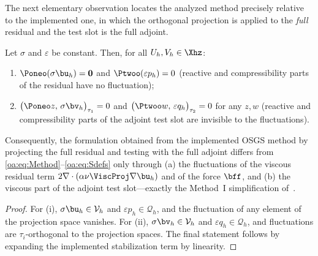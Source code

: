 The next elementary observation locates the analyzed method precisely relative to the
implemented one, in which the orthogonal projection is applied to the \emph{full}
residual and the test slot is the full adjoint.

\begin{lemma}
\label{oa:lem:annihilation}
Let $\sigma$ and $\varepsilon$ be constant. Then, for all $U_h, V_h \in \Xhz$:
\begin{enumerate}[label=\textup{(\roman*)}, itemsep=0.2ex]
  \item $\Poneo(\sigma\bu_h) = \boldsymbol{0}$ and $\Ptwoo(\varepsilon p_h) = 0$
        (reactive and compressibility parts of the residual have no fluctuation);
  \item $\bigl( \Poneo z,\, \sigma\bv_h \bigr)_{\tau_1} = 0$ and
        $\bigl( \Ptwoo w,\, \varepsilon q_h \bigr)_{\tau_2} = 0$ for any $z, w$
        (reactive and compressibility parts of the adjoint test slot are invisible to
        the fluctuations).
\end{enumerate}
Consequently, the formulation obtained from the implemented OSGS method by projecting
the full residual and testing with the full adjoint differs from
\cref{oa:eq:Method}--\cref{oa:eq:Sdefs} only through (a) the fluctuations of the viscous
residual term $2\nabla\cdot(\alpha\nu\ViscProj\nabla\bu_h)$ and of the force $\bff$,
and (b) the viscous part of the adjoint test slot---exactly the Method~I simplification
of~\cite{codina2008analysis}.
\end{lemma}

\begin{proof}
For (i), $\sigma\bu_h \in \mathcal{V}_h$ and $\varepsilon p_h \in \mathcal{Q}_h$, and the fluctuation of
any element of the projection space vanishes. For (ii), $\sigma\bv_h \in \mathcal{V}_h$ and
$\varepsilon q_h \in \mathcal{Q}_h$, and fluctuations are $\tau_i$-orthogonal to the projection
spaces. The final statement follows by expanding the implemented stabilization
term by linearity.
\end{proof}

